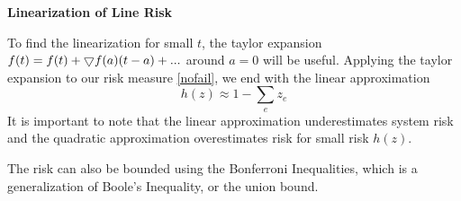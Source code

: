 \textbf{Linearization of Line Risk}

To find the linearization for small $t$, the taylor expansion $f(t)=f(t) + \bigtriangledown f (a)(t-a) +...$ around $a=0$ will be useful.  Applying the taylor expansion to our risk measure \ref{nofail}, we end with the linear approximation
\begin{equation}\label{linear}
h(z) \approx 1 - \sum_e z_e
\end{equation}
It is important to note that the linear approximation underestimates system risk and the quadratic approximation overestimates risk for small risk $h(z)$.

The risk can also be bounded using the Bonferroni Inequalities, which is a generalization of Boole's Inequality, or the union bound.
